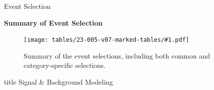 \documentclass[9pt,aspectratio=1610]{beamer}
\newcommand{\khl}[1]{\textbf{\color{structure}#1}}
\newcommand{\kmtab}[2]{\texttt{[image: tables/23-005-v07-marked-tables/\#1.pdf]}}
\begin{document}
\begin{frame}{Event Selection}
	
	\khl{Summary of Event Selection}
	\vspace{0.2em}
	\begin{figure}
		\centering
		\kmtab{table1}{height=0.75\textheight}
		\caption{Summary of the event selections, including both common and category-specific selections.}
	\end{figure}
\end{frame}

\begin{frame}
	\label{sec:model}
	\vfill
	\centering
	\begin{beamercolorbox}[sep=8pt,center,shadow=false,rounded=true]{title}
		\Huge Signal \& Background Modeling \par%
	\end{beamercolorbox}
	\vfill
\end{frame}
\end{document}
